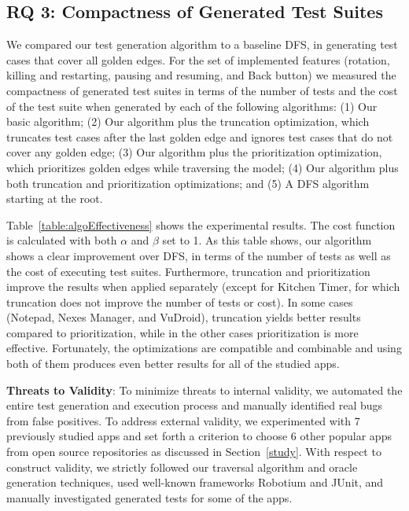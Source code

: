 \subsection{RQ 3: Compactness of Generated Test Suites}
We compared our test generation algorithm to a baseline DFS, in generating test cases that cover all golden edges. For the set of implemented features (rotation, killing and restarting, pausing and resuming, and Back button) we measured the compactness of generated test suites in terms of the number of tests and the cost of the test suite when generated by each of the following algorithms:
(1) Our basic algorithm;
(2) Our algorithm plus the truncation optimization, which truncates test cases after the last golden edge and ignores test cases that do not cover any golden edge;
(3) Our algorithm plus the prioritization optimization, which prioritizes golden edges while traversing the model;
(4) Our algorithm plus both truncation and prioritization optimizations; and
(5) A DFS algorithm starting at the root.

Table~\ref{table:algoEffectiveness} shows the experimental results. The cost function is calculated with both $\alpha$ and $\beta$ set to 1. As this table shows, our algorithm shows a clear improvement over DFS, in terms of the number of tests as well as the cost of executing test suites. Furthermore, truncation and prioritization improve the results when applied separately (except for Kitchen Timer, for which truncation does not improve the number of tests or cost). In some cases (Notepad, Nexes Manager, and VuDroid), truncation yields better results compared to prioritization, while in the other cases prioritization is more effective. Fortunately, the optimizations are compatible and combinable and using both of them produces even better results for all of the studied apps.



{\bf Threats to Validity}: To minimize threats to internal validity, we automated the entire test generation and execution process and manually identified real bugs from false positives. To address external validity, we experimented with 7 previously studied apps and set forth a criterion to choose 6 other popular apps from open source repositories as discussed in Section~\ref{study}. With respect to construct validity, we strictly followed our traversal algorithm and oracle generation techniques, used well-known frameworks Robotium and JUnit, and manually investigated generated tests for some of the apps. 

